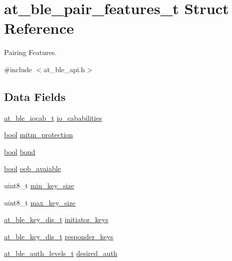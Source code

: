 \hypertarget{structat__ble__pair__features__t}{}\section{at\+\_\+ble\+\_\+pair\+\_\+features\+\_\+t Struct Reference}
\label{structat__ble__pair__features__t}


Pairing Features.  




{\ttfamily \#include $<$at\+\_\+ble\+\_\+api.\+h$>$}

\subsection*{Data Fields}
\begin{DoxyCompactItemize}
\item 
\mbox{\hyperlink{at__ble__api_8h_a94db8d982b31ca2cb106f01fc6d9afd4}{at\+\_\+ble\+\_\+iocab\+\_\+t}} \mbox{\hyperlink{structat__ble__pair__features__t_a8157240b63053697a4cdcc87b78525ec}{io\+\_\+cababilities}}
\item 
\mbox{\hyperlink{group__group__sam0__utils_ga97a80ca1602ebf2303258971a2c938e2}{bool}} \mbox{\hyperlink{structat__ble__pair__features__t_a0430e2654fcb685cbe7fe84688c4a6bc}{mitm\+\_\+protection}}
\item 
\mbox{\hyperlink{group__group__sam0__utils_ga97a80ca1602ebf2303258971a2c938e2}{bool}} \mbox{\hyperlink{structat__ble__pair__features__t_af408fae3fc79712c6c72a088b67c00d7}{bond}}
\item 
\mbox{\hyperlink{group__group__sam0__utils_ga97a80ca1602ebf2303258971a2c938e2}{bool}} \mbox{\hyperlink{structat__ble__pair__features__t_a1f9c825c648822ba2a91d9d41babb46a}{oob\+\_\+avaiable}}
\item 
uint8\+\_\+t \mbox{\hyperlink{structat__ble__pair__features__t_a66c3e526aae4ca7f3212ae207225b0a2}{min\+\_\+key\+\_\+size}}
\item 
uint8\+\_\+t \mbox{\hyperlink{structat__ble__pair__features__t_a43d814618fbf7f63a318966dd84746c2}{max\+\_\+key\+\_\+size}}
\item 
\mbox{\hyperlink{at__ble__api_8h_a3406daa27ebb020343610744c1e88560}{at\+\_\+ble\+\_\+key\+\_\+dis\+\_\+t}} \mbox{\hyperlink{structat__ble__pair__features__t_a5d50a35e7fd63e7011dabaedab0d535e}{initiator\+\_\+keys}}
\item 
\mbox{\hyperlink{at__ble__api_8h_a3406daa27ebb020343610744c1e88560}{at\+\_\+ble\+\_\+key\+\_\+dis\+\_\+t}} \mbox{\hyperlink{structat__ble__pair__features__t_a7040db09082753ec2ba9cc272aa7505e}{responder\+\_\+keys}}
\item 
\mbox{\hyperlink{at__ble__api_8h_aeb4d5485cd0d013e0991f8513c628357}{at\+\_\+ble\+\_\+auth\+\_\+levels\+\_\+t}} \mbox{\hyperlink{structat__ble__pair__features__t_abf6fc623b510d867745faeebf8845895}{desired\+\_\+auth}}
\end{DoxyCompactItemize}


